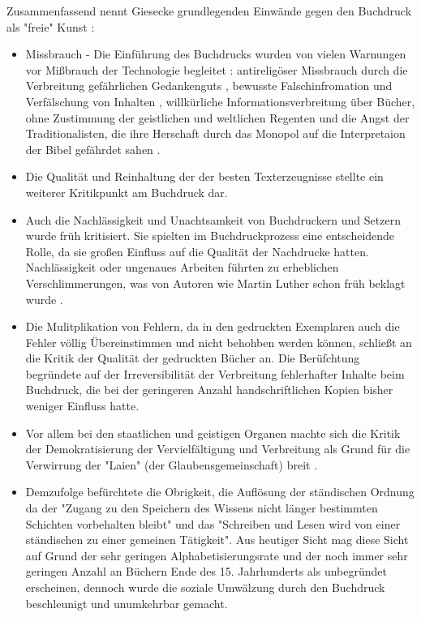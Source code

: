 Zusammenfassend nennt Giesecke grundlegenden Einwände gegen den Buchdruck als "freie" Kunst \cite{giesecke_1991_buchdruck}:
\begin{itemize}
\item Missbrauch - Die Einführung des Buchdrucks wurden von vielen Warnungen vor Mißbrauch der Technologie begleitet \cite{lange2008medienwettbewerb}: antireligöser Missbrauch durch die Verbreitung gefährlichen Gedankenguts \cite{kruse2003multimedia}, bewusste Falschinfromation und Verfälschung von Inhalten \cite{sprachgeschichte_1998_besch},  willkürliche Informationsverbreitung über Bücher, ohne Zustimmung der geistlichen und weltlichen Regenten \cite{rother_2002_siebenbuergen} und die Angst der Traditionalisten, die ihre Herschaft durch das Monopol auf die Interpretaion der Bibel gefährdet sahen \cite{lange2008medienwettbewerb}.
\item Die Qualität und Reinhaltung der der besten Texterzeugnisse \cite{giesecke_1991_buchdruck} stellte ein weiterer Kritikpunkt am Buchdruck dar.
\item Auch die Nachlässigkeit und Unachtsamkeit von Buchdruckern und Setzern wurde früh kritisiert. Sie spielten im Buchdruckprozess eine entscheidende Rolle, da sie großen Einfluss auf die Qualität der Nachdrucke hatten. Nachlässigkeit oder ungenaues Arbeiten führten zu erheblichen Verschlimmerungen, was von Autoren wie Martin Luther schon früh beklagt wurde \cite{sprachgeschichte_1998_besch}.
\item Die Mulitplikation von Fehlern, da in den gedruckten Exemplaren auch die Fehler völlig Übereinstimmen und nicht behohben werden können, schließt an die Kritik der Qualität der gedruckten Bücher an. Die Berüfchtung begründete auf der Irreversibilität der Verbreitung fehlerhafter Inhalte beim Buchdruck, die bei der geringeren Anzahl handschriftlichen Kopien bisher weniger Einfluss hatte.
\item Vor allem bei den staatlichen und geistigen Organen machte sich die Kritik der Demokratisierung der Vervielfältigung und Verbreitung als Grund für die Verwirrung der "Laien" (der Glaubensgemeinschaft) breit \cite{giesecke_1991_buchdruck}.
\item Demzufolge befürchtete die Obrigkeit, die Auflösung der ständischen Ordnung da der "Zugang zu den Speichern des Wissens nicht länger bestimmten Schichten vorbehalten bleibt" und das "Schreiben und Lesen wird von einer ständischen zu einer gemeinen Tätigkeit". Aus heutiger Sicht mag diese Sicht auf Grund der sehr geringen Alphabetisierungsrate und der noch immer sehr geringen Anzahl an Büchern Ende des 15. Jahrhunderts als unbegründet erscheinen, dennoch wurde die soziale Umwälzung durch den Buchdruck beschleunigt und unumkehrbar gemacht. \cite{giesecke_1991_buchdruck}

\end{itemize}
